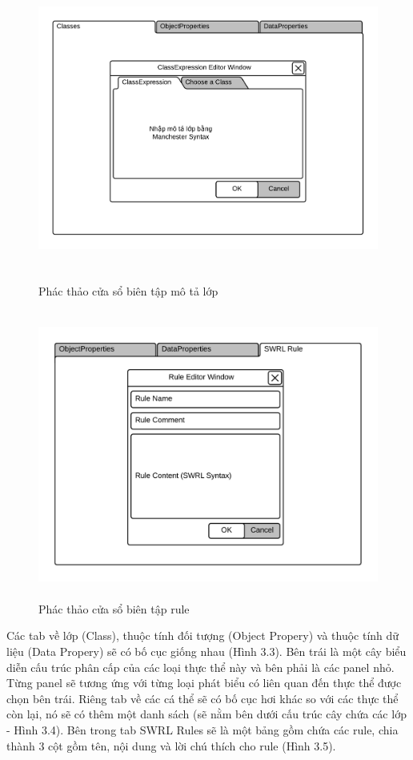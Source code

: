 \begin{figure}[h!]
	\centering
	\includegraphics[width=150mm,height=100mm]{Figures/ui_classexpressioneditor.png}
	\caption{Phác thảo cửa sổ biên tập mô tả lớp\label{overflow}}
\end{figure}
\begin{figure}[h!]
	\centering
	\includegraphics[width=155mm,height=95mm]{Figures/ui_mainview_ruleeditor.png}
	\caption{Phác thảo cửa sổ biên tập rule \label{overflow}}
\end{figure}
Các tab về lớp (Class), thuộc tính đối tượng (Object Propery) và thuộc tính dữ liệu (Data Propery) sẽ có bố cục giống nhau (Hình 3.3). Bên trái là một cây biểu diễn cấu trúc phân cấp của các loại thực thể này và bên phải là các panel nhỏ. Từng panel sẽ tương ứng với từng loại phát biểu có liên quan đến thực thể được chọn bên trái. Riêng tab về các cá thể sẽ có bố cục hơi khác so với các thực thể còn lại, nó sẽ có thêm một danh sách (sẽ nằm bên dưới cấu trúc cây chứa các lớp - Hình 3.4). Bên trong tab SWRL Rules sẽ là một bảng gồm chứa các rule, chia thành 3 cột gồm tên, nội dung và lời chú thích cho rule (Hình 3.5).

